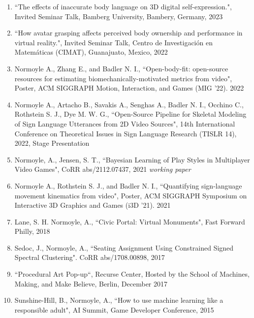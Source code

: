 \begin{enumerate}[leftmargin=*]

\item ``The effects of inaccurate body language on 3D digital self-expression.", Invited Seminar Talk, Bamberg University, Bambery, Germany, 2023

\item ``How avatar grasping affects perceived body ownership and performance in virtual reality.", Invited Seminar Talk, Centro de Investigaci\'{o}n en Matem\'{a}ticas (CIMAT), Guanajuato, Mexico, 2022

\item Normoyle A., Zhang E., and Badler N. I., ``Open-body-fit: open-source resources for estimating biomechanically-motivated metrics from video", Poster, ACM SIGGRAPH Motion, Interaction, and Games (MIG '22). 2022

\item Normoyle A., Artacho B., Savakis A., Senghas A., Badler N. I., Occhino C., Rothstein S. J., Dye M. W. G., ``Open-Source Pipeline for Skeletal Modeling of Sign Language Utterances from 2D Video Sources", 14th International Conference on Theoretical Issues in Sign Language Research (TISLR 14), 2022, Stage Presentation

\item Normoyle, A., Jensen, S. T., ``Bayesian Learning of Play Styles in Multiplayer Video Games", CoRR abs/2112.07437, 2021 \emph{working paper}

\item Normoyle A., Rothstein S. J., and Badler N. I., ``Quantifying sign-language movement kinematics from video", Poster, ACM SIGGRAPH Symposium on Interactive 3D Graphics and Games (i3D '21). 2021

\item Lane, S. H. Normoyle, A., ``Civic Portal: Virtual Monuments", Fast Forward Philly, 2018

\item Sedoc, J., Normoyle, A., ``Seating Assignment Using Constrained Signed Spectral Clustering". CoRR abs/1708.00898, 2017 

\item ``Procedural Art Pop-up``, Recurse Center, Hosted by the School of Machines, Making, and Make Believe, Berlin, December 2017 

\item Sunshine-Hill, B., Normoyle, A., ``How to use machine learning like a responsible adult", AI Summit, Game Developer Conference, 2015


\end{enumerate}
